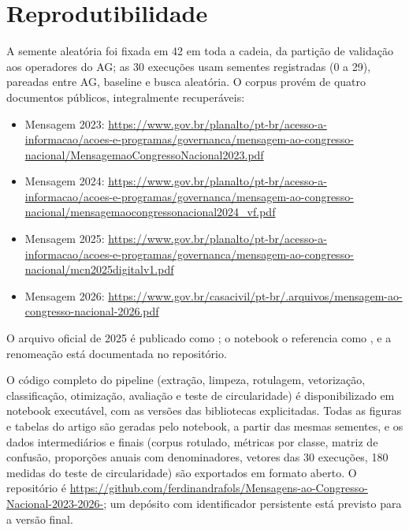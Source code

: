 \documentclass[fleqn,10pt]{SelfArx}
\begin{document}
\section{Reprodutibilidade}
\label{sec:repro}

A semente aleatória foi fixada em 42 em toda a cadeia, da partição de validação aos operadores do AG; as 30 execuções usam sementes registradas (0 a 29), pareadas entre AG, baseline e busca aleatória. O corpus provém de quatro documentos públicos, integralmente recuperáveis:

\begin{itemize}[noitemsep]
\item Mensagem 2023: \url{https://www.gov.br/planalto/pt-br/acesso-a-informacao/acoes-e-programas/governanca/mensagem-ao-congresso-nacional/MensagemaoCongressoNacional2023.pdf}
\item Mensagem 2024: \url{https://www.gov.br/planalto/pt-br/acesso-a-informacao/acoes-e-programas/governanca/mensagem-ao-congresso-nacional/mensagemaocongressonacional2024_vf.pdf}
\item Mensagem 2025: \url{https://www.gov.br/planalto/pt-br/acesso-a-informacao/acoes-e-programas/governanca/mensagem-ao-congresso-nacional/mcn2025digitalv1.pdf}
\item Mensagem 2026: \url{https://www.gov.br/casacivil/pt-br/.arquivos/mensagem-ao-congresso-nacional-2026.pdf}
\end{itemize}

O arquivo oficial de 2025 é publicado como ; o notebook o referencia como , e a renomeação está documentada no repositório.

O código completo do pipeline (extração, limpeza, rotulagem, vetorização, classificação, otimização, avaliação e teste de circularidade) é disponibilizado em notebook executável, com as versões das bibliotecas explicitadas. Todas as figuras e tabelas do artigo são geradas pelo notebook, a partir das mesmas sementes, e os dados intermediários e finais (corpus rotulado, métricas por classe, matriz de confusão, proporções anuais com denominadores, vetores das 30 execuções, 180 medidas do teste de circularidade) são exportados em formato aberto. O repositório é \url{https://github.com/ferdinandrafols/Mensagens-ao-Congresso-Nacional-2023-2026-}; um depósito com identificador persistente está previsto para a versão final.
\end{document}
